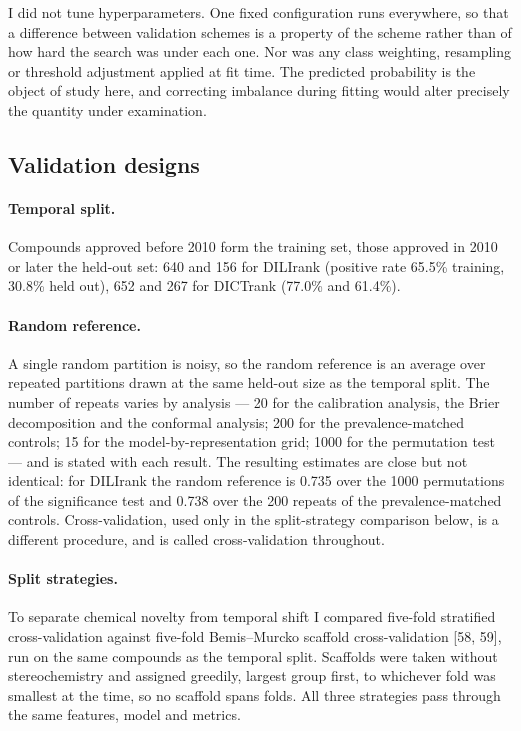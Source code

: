 I did not tune hyperparameters. One fixed configuration runs everywhere, so that a difference between validation schemes is a property of the scheme rather than of how hard the search was under each one. Nor was any class weighting, resampling or threshold adjustment applied at fit time. The predicted probability is the object of study here, and correcting imbalance during fitting would alter precisely the quantity under examination.

\subsection{Validation designs}

\paragraph{Temporal split.}
Compounds approved before 2010 form the training set, those approved in 2010 or later the held-out set: 640 and 156 for DILIrank (positive rate 65.5\% training, 30.8\% held out), 652 and 267 for DICTrank (77.0\% and 61.4\%).

\paragraph{Random reference.}
A single random partition is noisy, so the random reference is an average over repeated partitions drawn at the same held-out size as the temporal split. The number of repeats varies by analysis --- 20 for the calibration analysis, the Brier decomposition and the conformal analysis; 200 for the prevalence-matched controls; 15 for the model-by-representation grid; 1000 for the permutation test --- and is stated with each result. The resulting estimates are close but not identical: for DILIrank the random reference is 0.735 over the 1000 permutations of the significance test and 0.738 over the 200 repeats of the prevalence-matched controls. Cross-validation, used only in the split-strategy comparison below, is a different procedure, and is called cross-validation throughout.

\paragraph{Split strategies.}
To separate chemical novelty from temporal shift I compared five-fold stratified cross-validation against five-fold Bemis--Murcko scaffold cross-validation [58, 59], run on the same compounds as the temporal split. Scaffolds were taken without stereochemistry and assigned greedily, largest group first, to whichever fold was smallest at the time, so no scaffold spans folds. All three strategies pass through the same features, model and metrics.

